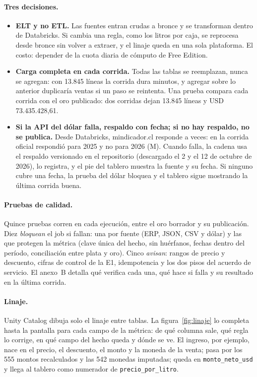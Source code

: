 \paragraph{Tres decisiones.}
\begin{itemize}\setlength\itemsep{1pt}
\item \textbf{ELT y no ETL.} Las fuentes entran crudas a bronce y se transforman dentro de Databricks. Si cambia una regla, como los litros por caja, se reprocesa desde bronce sin volver a extraer, y el linaje queda en una sola plataforma. El costo: depender de la cuota diaria de cómputo de Free Edition.
\item \textbf{Carga completa en cada corrida.} Todas las tablas se reemplazan, nunca se agregan: con 13.845 líneas la corrida dura minutos, y agregar sobre lo anterior duplicaría ventas si un paso se reintenta. Una prueba compara cada corrida con el oro publicado: dos corridas dejan 13.845 líneas y USD 73.435.428,61.
\item \textbf{Si la API del dólar falla, respaldo con fecha; si no hay respaldo, no se publica.} Desde Databricks, mindicador.cl responde a veces: en la corrida oficial respondió para 2025 y no para 2026 (M). Cuando falla, la cadena usa el respaldo versionado en el repositorio (descargado el 2 y el 12 de octubre de 2026), lo registra, y el pie del tablero muestra la fuente y su fecha. Si ninguno cubre una fecha, la prueba del dólar bloquea y el tablero sigue mostrando la última corrida buena.
\end{itemize}

\paragraph{Pruebas de calidad.} Quince pruebas corren en cada ejecución, entre el oro borrador y su publicación. Diez \emph{bloquean} el job si fallan: una por fuente (ERP, JSON, CSV y dólar) y las que protegen la métrica (clave única del hecho, sin huérfanos, fechas dentro del período, conciliación entre plata y oro). Cinco \emph{avisan}: rangos de precio y descuento, cifras de control de la E1, idempotencia y los dos pisos del acuerdo de servicio. El anexo~B detalla qué verifica cada una, qué hace si falla y su resultado en la última corrida.

\paragraph{Linaje.} Unity Catalog dibuja solo el linaje entre tablas. La figura~\ref{fig:linaje} lo completa hasta la pantalla para cada campo de la métrica: de qué columna sale, qué regla lo corrige, en qué campo del hecho queda y dónde se ve. El ingreso, por ejemplo, nace en el precio, el descuento, el monto y la moneda de la venta; pasa por los 555 montos recalculados y las 542 monedas imputadas; queda en \texttt{monto\_neto\_usd} y llega al tablero como numerador de \texttt{precio\_por\_litro}.

